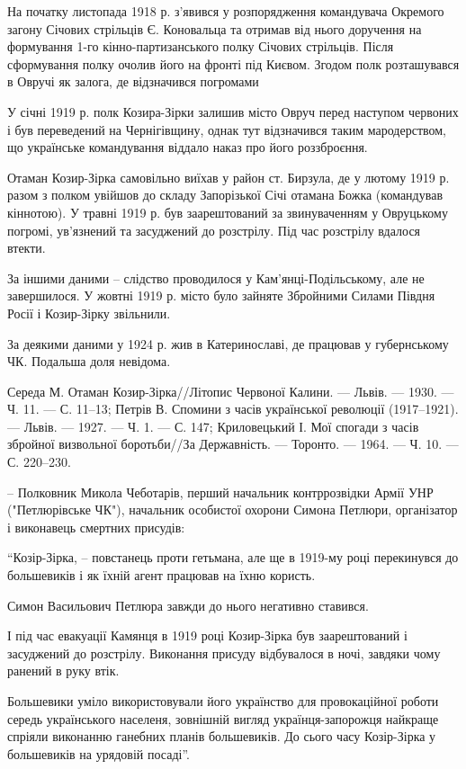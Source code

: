 На початку листопада 1918 р. з'явився у розпорядження командувача Окремого
загону Січових стрільців Є. Коновальца та отримав від нього доручення на
формування 1-го кінно-партизанського полку Січових стрільців. Після
сформування полку очолив його на фронті під Києвом. Згодом полк розташувався
в Овручі як залога, де відзначився погромами

У січні 1919 р. полк Козира-Зірки залишив місто Овруч перед наступом червоних і
був переведений на Чернігівщину, однак тут відзначився таким мародерством, що
українське командування віддало наказ про його роззброєння. 

Отаман Козир-Зірка самовільно виїхав у район ст. Бирзула, де у лютому 1919 р.
разом з полком увійшов до складу Запорізької Січі отамана Божка (командував
кіннотою). У травні 1919 р. був заарештований за звинуваченням у Овруцькому
погромі, ув'язнений та засуджений до розстрілу. Під час розстрілу вдалося
втекти. 

За іншими даними – слідство проводилося у Кам'янці-Подільському, але не
завершилося. У жовтні 1919 р. місто було зайняте Збройними Силами Півдня
Росії і Козир-Зірку звільнили.

За деякими даними у 1924 р. жив в Катеринославі, де працював у губернському ЧК. Подальша доля невідома.

Середа М. Отаман Козир-Зірка//Літопис Червоної Калини. — Львів. — 1930. — Ч.
11. — С. 11–13; Петрів В. Спомини з часів української революції (1917–1921). —
Львів. — 1927. — Ч. 1. — С. 147; Криловецький І. Мої спогади з часів збройної
визвольної боротьби//За Державність. — Торонто. — 1964. — Ч. 10. — С. 220–230.

\zzrule

– Полковник Микола Чеботарів, перший начальник контррозвідки Армії УНР
("Петлюрівське ЧК"), начальник особистої охорони Симона Петлюри, організатор і
виконавець смертних присудів:

“Козір-Зірка, – повстанець проти гетьмана, але ще в 1919-му році перекинувся до
большевиків і як їхній агент працював на їхню користь. 

Симон Васильович Петлюра завжди до нього негативно ставився. 

І під час евакуації Камянця в 1919 році Козир-Зірка був заарештований і
засуджений до розстрілу. Виконання присуду відбувалося в ночі, завдяки чому
ранений в руку втік.

Большевики уміло використовували його українство для провокаційної роботи
середь українського населеня, зовнішній вигляд українця-запорожця найкраще
спріяли виконанню ганебних планів большевиків. До сього часу Козір-Зірка у
большевиків на урядовій посаді”.

